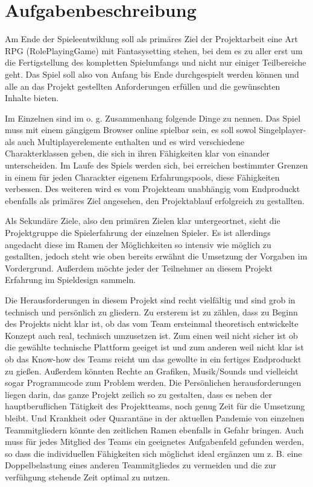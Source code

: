 

\section{Aufgabenbeschreibung}

Am Ende der Spieleentwiklung soll als primäres Ziel der Projektarbeit eine Art RPG (RolePlayingGame) mit Fantasysetting stehen, bei dem es zu aller erst um die Fertigstellung des kompletten Spielumfangs und nicht nur einiger Teilbereiche geht. Das Spiel soll also von Anfang bis Ende durchgespielt werden können und alle an das Projekt gestellten Anforderungen erfüllen und die gewünschten Inhalte bieten. 

Im Einzelnen sind im o. g. Zusammenhang folgende Dinge zu nennen. Das Spiel muss mit einem gängigem Browser online spielbar sein, es soll sowol Singelplayer- als auch Multiplayerelemente enthalten und es wird verschiedene Charakterklassen geben, die sich in ihren Fähigkeiten klar von einander unterscheiden. Im Laufe des Spiels werden sich, bei erreichen bestimmter Grenzen in einem für jeden Charackter eigenem Erfahrungspools, diese Fähigkeiten verbessen. Des weiteren wird es vom Projekteam unabhängig vom Endproduckt ebenfalls als primäres Ziel angesehen, den Projektablauf erfolgreich zu gestallten.

Als Sekundäre Ziele, also den primären Zielen klar untergeortnet, sieht die Projektgruppe die Spielerfahrung der einzelnen Spieler. Es ist allerdings angedacht diese im Ramen der Möglichkeiten so intensiv wie möglich zu gestallten, jedoch steht wie oben bereits erwähnt die Umsetzung der Vorgaben im Vordergrund. Außerdem möchte jeder der Teilnehmer an diesem Projekt Erfahrung im Spieldesign sammeln.

Die Herausforderungen in diesem Projekt sind recht vielfältig und sind grob in technisch und persönlich zu gliedern. Zu ersterem ist zu zählen, dass zu Beginn des Projekts nicht klar ist, ob das vom Team ersteinmal theoretisch entwickelte Konzept auch real, technisch umzusetzen ist. Zum einen weil nicht sicher ist ob die gewählte technische Plattform geeiget ist und zum anderen weil nicht klar ist ob das Know-how des Teams reicht um das gewollte in ein fertiges Endproduckt zu gießen. Außerdem könnten Rechte an Grafiken, Musik/Sounds und vielleicht sogar Programmcode zum Problem werden. Die Persönlichen herausforderungen liegen darin, das ganze Projekt zeilich so zu gestalten, dass es neben der hauptberuflichen Tätigkeit des Projektteams, noch genug Zeit für die Umsetzung bleibt. Und Krankheit oder Quarantäne in der aktuellen Pandemie von einzelnen Teammitgliedern könnte den zeitlichen Ramen ebenfalls in Gefahr bringen. Auch muss für jedes Mitglied des Teams ein geeignetes Aufgabenfeld gefunden werden, so dass die individuellen Fähigkeiten sich möglichst ideal ergänzen um z. B. eine Doppelbelastung eines anderen Teammitgliedes zu vermeiden und die zur verfühgung stehende Zeit optimal zu nutzen. 



